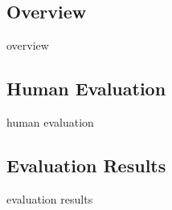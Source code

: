\subsection{Overview}
overview
\subsection{Human Evaluation}
human evaluation
\subsection{Evaluation Results}
evaluation results
\newpage